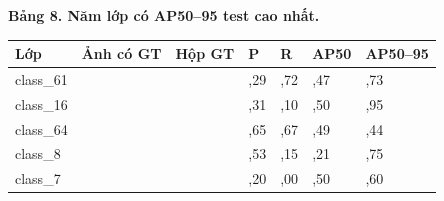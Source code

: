 \documentclass[
  vietnamese,
  12pt,
  a4paper,
]{article}
\newcounter{none} %
\begin{document}
\textbf{Bảng 8. Năm lớp có AP50--95 test cao nhất.}

\begingroup\small\setlength{\tabcolsep}{4pt}\renewcommand{\arraystretch}{1.12}

{\def\LTcaptype{none} %
\begin{longtable}[]{@{}
  >{\raggedright\arraybackslash}p{}
  >{\raggedright\arraybackslash}p{}
  >{\raggedright\arraybackslash}p{}
  >{\raggedright\arraybackslash}p{}
  >{\raggedright\arraybackslash}p{}
  >{\raggedright\arraybackslash}p{}
  >{\raggedright\arraybackslash}p{}@{}}
\toprule\noalign{}
\begin{minipage}[b]{\linewidth}\raggedright
Lớp
\end{minipage} & \begin{minipage}[b]{\linewidth}\raggedright
Ảnh có GT
\end{minipage} & \begin{minipage}[b]{\linewidth}\raggedright
Hộp GT
\end{minipage} & \begin{minipage}[b]{\linewidth}\raggedright
P
\end{minipage} & \begin{minipage}[b]{\linewidth}\raggedright
R
\end{minipage} & \begin{minipage}[b]{\linewidth}\raggedright
AP50
\end{minipage} & \begin{minipage}[b]{\linewidth}\raggedright
AP50--95
\end{minipage} \\
\midrule\noalign{}
\endhead
\bottomrule\noalign{}
\endlastfoot
class\_61 & 71 & 78 & 98,29 & 98,72 & 99,47 & 96,73 \\
class\_16 & 94 & 111 & 98,31 & 99,10 & 99,50 & 95,95 \\
class\_64 & 66 & 74 & 98,65 & 98,67 & 99,49 & 95,44 \\
class\_8 & 54 & 54 & 97,53 & 98,15 & 99,21 & 94,75 \\
class\_7 & 61 & 96 & 99,20 & 100,00 & 99,50 & 94,60 \\
\end{longtable}
}
\end{document}
